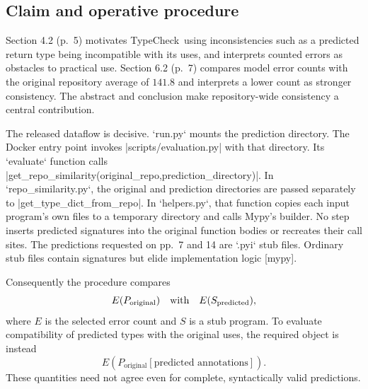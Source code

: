 \documentclass[10pt]{article}
\begin{document}
\subsection*{Claim and operative procedure}
Section 4.2 (p. 5) motivates TypeCheck using inconsistencies such as a predicted return type being incompatible with its uses, and interprets counted errors as obstacles to practical use. Section 6.2 (p. 7) compares model error counts with the original repository average of \(141.8\) and interprets a lower count as stronger consistency. The abstract and conclusion make repository-wide consistency a central contribution.\par
The released dataflow is decisive. `run.py` mounts the prediction directory. The Docker entry point invokes |scripts/evaluation.py| with that directory. Its `evaluate` function calls |get\_repo\_similarity(original\_repo,prediction\_directory)|. In `repo\_similarity.py`, the original and prediction directories are passed separately to |get\_type\_dict\_from\_repo|. In `helpers.py`, that function copies each input program’s own files to a temporary directory and calls Mypy’s builder. No step inserts predicted signatures into the original function bodies or recreates their call sites. The predictions requested on pp. 7 and 14 are `.pyi` stub files. Ordinary stub files contain signatures but elide implementation logic [mypy].\par
Consequently the procedure compares \[E(P_{\mathrm{original}})\quad\hbox{with}\quad
 E(S_{\mathrm{predicted}}),\] where \(E\) is the selected error count and \(S\) is a stub program. To evaluate compatibility of predicted types with the original uses, the required object is instead \[E\!\left(P_{\mathrm{original}}[
       \text{predicted annotations}]\right).\] These quantities need not agree even for complete, syntactically valid predictions.\par
\end{document}
